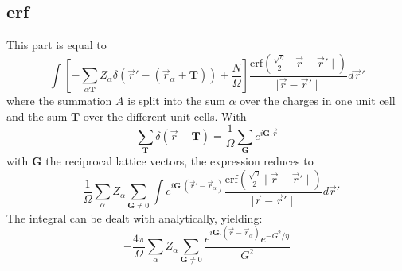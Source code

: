 \documentclass[11pt,a4paper]{article}
\begin{document}
\subsection{erf}
This part is equal to
\begin{equation}
\int \left[ - \sum\limits_{\alpha \mathbf{T}} Z_{\alpha} \delta(\vec{r}' - (\vec{r}_{\alpha} + \mathbf{T})) + \frac{N}{\Omega} \right]  \frac{\text{erf}\left( \frac{\sqrt{\eta}}{2} \mid \vec{r} - \vec{r}' \mid \right)}{\mid \vec{r} - \vec{r}' \mid} d\vec{r}'
\end{equation}
where the summation $A$ is split into the sum $\alpha$ over the charges in one unit cell and the sum $\mathbf{T}$ over the different unit cells. With
\begin{equation}
\sum\limits_{\mathbf{T}} \delta(\vec{r} - \mathbf{T}) = \frac{1}{\Omega} \sum\limits_{\mathbf{G}} e^{i \mathbf{G} . \vec{r}}
\end{equation}
with $\mathbf{G}$ the reciprocal lattice vectors, the expression reduces to
\begin{equation}
-\frac{1}{\Omega} \sum\limits_{\alpha} Z_{\alpha} \sum\limits_{\mathbf{G} \neq 0} \int e^{i \mathbf{G}.(\vec{r}' - \vec{r}_{\alpha})} \frac{\text{erf}\left( \frac{\sqrt{\eta}}{2} \mid \vec{r} - \vec{r}' \mid \right)}{\mid \vec{r} - \vec{r}' \mid} d\vec{r}'
\end{equation}
The integral can be dealt with analytically, yielding:
\begin{equation}
- \frac{4 \pi}{\Omega} \sum\limits_{\alpha} Z_{\alpha} \sum\limits_{\mathbf{G} \neq 0} \frac{e^{i \mathbf{G}.(\vec{r} - \vec{r}_{\alpha})} e^{-G^2/\eta}}{G^2}
\end{equation}
\end{document}

